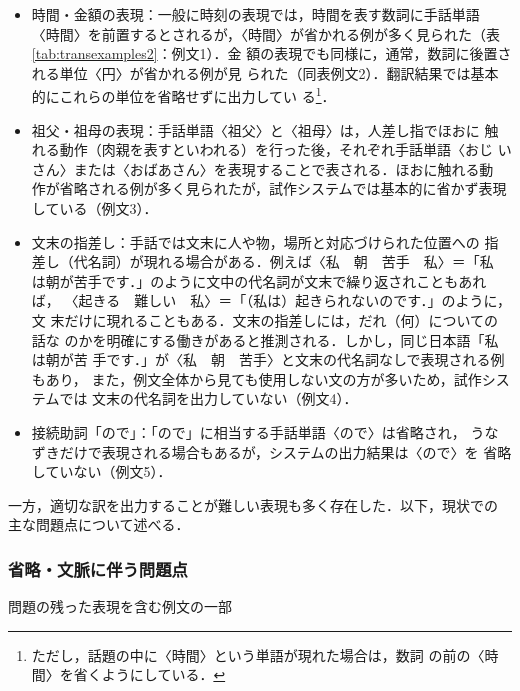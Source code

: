 \documentclass[japanese]{jnlp_1.4}
\newcounter{example}
\begin{document}
\begin{itemize}
  \renewcommand{\labelenumi}{}
\item 時間・金額の表現：一般に時刻の表現では，時間を表す数詞に手話単語
  〈時間〉を前置するとされるが，〈時間〉が省かれる例が多く見られた（表
  \ref{tab:transexamples2}：例文1）．金
  額の表現でも同様に，通常，数詞に後置される単位〈円〉が省かれる例が見
  られた（同表例文2）．翻訳結果では基本的にこれらの単位を省略せずに出力してい
  る\footnote{ただし，話題の中に〈時間〉という単語が現れた場合は，数詞
    の前の〈時間〉を省くようにしている．}．
\item 祖父・祖母の表現：手話単語〈祖父〉と〈祖母〉は，人差し指でほおに
  触れる動作（肉親を表すといわれる）を行った後，それぞれ手話単語〈おじ
  いさん〉または〈おばあさん〉を表現することで表される．ほおに触れる動
  作が省略される例が多く見られたが，試作システムでは基本的に省かず表現
  している（例文3）．
\item 文末の指差し：手話では文末に人や物，場所と対応づけられた位置への
  指差し（代名詞）が現れる場合がある．例えば〈私　朝　苦手　私〉＝「私
  は朝が苦手です．」のように文中の代名詞が文末で繰り返されこともあれば，
  〈起きる　難しい　私〉＝「（私は）起きられないのです．」のように，文
  末だけに現れることもある．文末の指差しには，だれ（何）についての話な
  のかを明確にする働きがあると推測される．しかし，同じ日本語「私は朝が苦
  手です．」が〈私　朝　苦手〉と文末の代名詞なしで表現される例もあり，
  また，例文全体から見ても使用しない文の方が多いため，試作システムでは
  文末の代名詞を出力していない（例文4）．
\item 接続助詞「ので」：「ので」に相当する手話単語〈ので〉は省略され，
  うなずきだけで表現される場合もあるが，システムの出力結果は〈ので〉を
  省略していない（例文5）．

\end{itemize}




一方，適切な訳を出力することが難しい表現も多く存在した．以下，現状での
主な問題点について述べる．



\subsubsection{省略・文脈に伴う問題点}

\begin{table}[t]
  \caption{問題の残った表現を含む例文の一部}
  \label{tab:problems}

\end{table}
\end{document}
